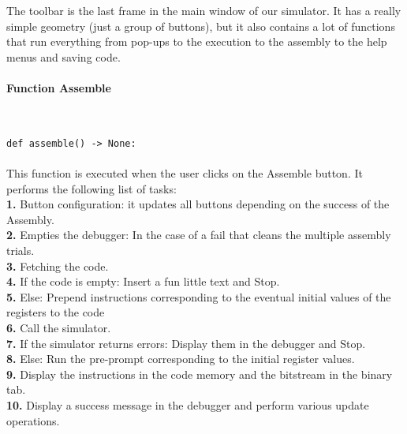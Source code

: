 \documentclass{article}
\newcommand{\subsubsubsection}[1]{\paragraph{#1}\mbox{}\\}
\begin{document}
The toolbar is the last frame in the main window of our simulator. It has a really simple geometry (just a group of buttons), but it also contains a lot of functions that run everything from pop-ups to the execution to the assembly to the help menus and saving code.

\paragraph{}
\subsubsubsection{Function Assemble}
\begin{lstlisting}[language=MyPython]
def assemble() -> None:
\end{lstlisting}
\paragraph{}

This function is executed when the user clicks on the Assemble button. It performs the following list of tasks: \\
\textbf{1.} Button configuration: it updates all buttons depending on the success of the Assembly. \\
\textbf{2.} Empties the debugger: In the case of a fail that cleans the multiple assembly trials. \\
\textbf{3.} Fetching the code. \\
\textbf{4.} If the code is empty: Insert a fun little text and Stop. \\
\textbf{5.} Else: Prepend instructions corresponding to the eventual initial values of the registers to the code \\
\textbf{6.} Call the simulator. \\
\textbf{7.} If the simulator returns errors: Display them in the debugger and Stop. \\
\textbf{8.} Else: Run the pre-prompt corresponding to the initial register values. \\
\textbf{9.} Display the instructions in the code memory and the bitstream in the binary tab. \\
\textbf{10.} Display a success message in the debugger and perform various update operations. \\

\paragraph{}
\end{document}

